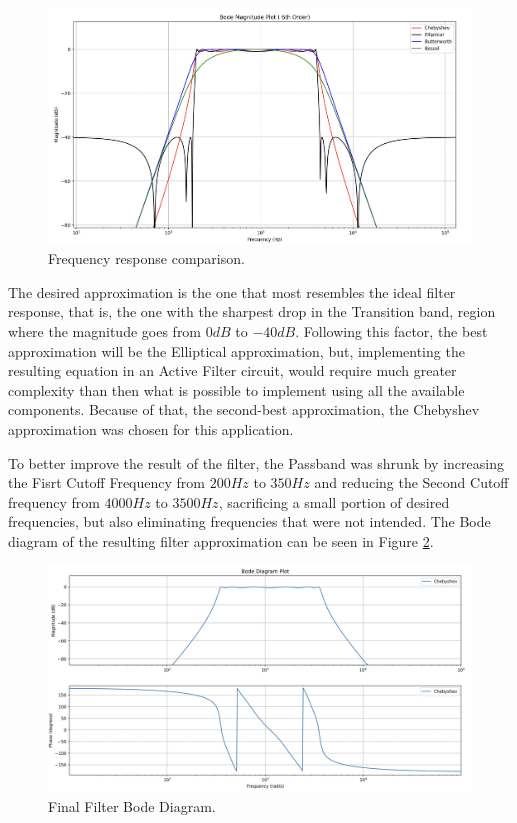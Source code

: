 \begin{figure}[H]
    \centering
    \includegraphics*[scale = 0.3]{Images/FilterBode.png}
    \caption{Frequency response comparison.}
    \label{fig:FilterResponse}
\end{figure}

The desired approximation is the one that most resembles the ideal filter response, that is, the one with the sharpest drop in the Transition band, region where the magnitude goes from $0dB$ to $-40dB$. Following this factor, the best approximation will be the Elliptical approximation, but, implementing the resulting equation in an Active Filter circuit, would require much greater complexity than then what is possible to implement using all the available components. Because of that, the second-best approximation, the Chebyshev approximation was chosen for this application. 

To better improve the result of the filter, the Passband was shrunk by increasing the Fisrt Cutoff Frequency from $200Hz$ to $350Hz$ and reducing the Second Cutoff frequency from $4000Hz$ to $3500Hz$, sacrificing a small portion of desired frequencies, but also eliminating frequencies that were not intended. The Bode diagram of the resulting filter approximation can be seen in Figure \ref{fig:FilterFinal}.

\begin{figure}[H]
    \centering
    \includegraphics*[scale = 0.3]{Images/FilterFinal.png}
    \caption{Final Filter Bode Diagram.}
    \label{fig:FilterFinal}
\end{figure}

